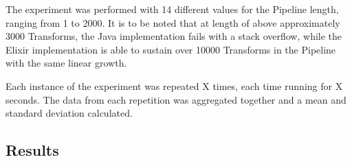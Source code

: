 The experiment was performed with 14 different values for the Pipeline length, ranging from 1 to 2000.
It is to be noted that at length of above approximately 3000 Transforms, the Java implementation fails with a stack overflow, while the Elixir implementation is able to sustain over 10000 Transforms in the Pipeline with the same linear growth.

Each instance of the experiment was repeated X times, each time running for X seconds.
The data from each repetition was aggregated together and a mean and standard deviation calculated.

\subsection{Results}



